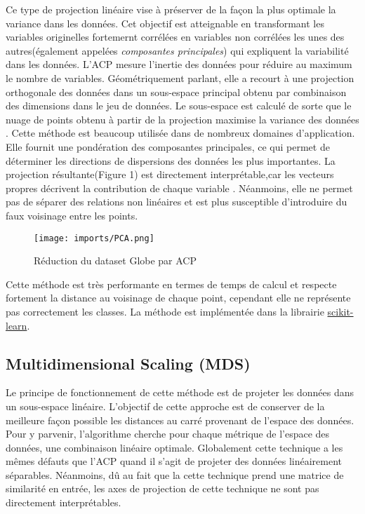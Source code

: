 Ce type de projection linéaire vise à préserver de la façon la plus optimale la variance dans les données. Cet objectif est atteignable en transformant les variables originelles fortemernt corrélées en variables non corrélées les unes des autres(également appelées \textit{composantes principales}) qui expliquent la variabilité dans les données.
L’ACP mesure l’inertie des données pour réduire au maximum le nombre de variables. 
Géométriquement parlant, elle a recourt à une projection orthogonale des données dans un sous-espace principal obtenu par combinaison des dimensions dans le jeu de données. Le sous-espace est calculé de sorte que le nuage de points obtenu à partir de la projection maximise la variance des données \cite{HeulotThese}.\newline
Cette méthode est beaucoup utilisée dans de nombreux domaines d’application. Elle fournit une pondération des composantes principales, ce qui permet de déterminer les directions de dispersions des données les plus importantes.
La projection résultante(Figure 1) est directement interprétable,car les vecteurs propres décrivent la contribution de chaque variable \cite{HeulotThese}.
Néanmoins, elle ne permet pas de séparer des relations non linéaires et est plus susceptible d’introduire du faux voisinage entre les points.

\begin{center}
    \begin{figure}[ht!]
        \centering
        
        \texttt{[image: imports/PCA.png]}
        
        \caption{Réduction du dataset Globe par ACP}
    \end{figure}
\end{center}

Cette méthode est très performante en termes de temps de calcul et respecte fortement la distance au voisinage de chaque point, cependant elle ne représente pas correctement les classes.
\smallskip
La méthode est implémentée dans la librairie \href{https://scikit-learn.org/stable/modules/generated/sklearn.decomposition.PCA.html}{scikit-learn}.

\subsection{Multidimensional Scaling (MDS)}

Le principe de fonctionnement de cette méthode est de projeter les données dans un sous-espace linéaire\cite{abdi2007-MDS}. L'objectif de cette approche est de conserver de la meilleure façon possible les distances au carré provenant de l’espace des données. 
Pour y parvenir, l'algorithme cherche pour chaque métrique de l'espace des données, une combinaison linéaire optimale. Globalement cette technique a les mêmes défauts que l’ACP quand il s’agit de projeter des données linéairement séparables.
Néanmoins, dû au fait que la cette technique prend une matrice de similarité en entrée, les axes de projection de cette technique ne sont pas directement interprétables\cite{HeulotThese}.

